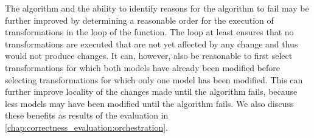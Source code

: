 
The algorithm and the ability to identify reasons for the algorithm to fail may be further improved by determining a reasonable order for the execution of transformations in the loop of the  function.
The loop at least ensures that no transformations are executed that are not yet affected by any change and thus would not produce changes.
It can, however, also be reasonable to first select transformations for which both models have already been modified before selecting transformations for which only one model has been modified.
This can further improve locality of the changes made until the algorithm fails, because less models may have been modified until the algorithm fails.
We also discuss these benefits as results of the evaluation in \autoref{chap:correctness_evaluation:orchestration}.



